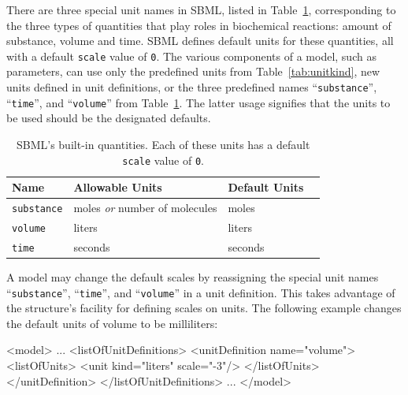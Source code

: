 \documentclass[10pt]{cekarticle}
\newenvironment{blockChanged}{\color{BrickRed}}{}
\begin{document}
\begin{blockChanged}
There are three special unit names in SBML, listed in
Table~\ref{tab:builtin}, corresponding to the three types of quantities
that play roles in biochemical reactions: amount of substance, volume and
time.  SBML defines default units for these quantities, all with a default
\texttt{scale} value of \texttt{0}.  The various components of a model,
such as parameters, can use only the predefined units from
Table~\ref{tab:unitkind}, new units defined in unit definitions, or the
three predefined names ``\texttt{substance}'', ``\texttt{time}'', and
``\texttt{volume}'' from Table~\ref{tab:builtin}.  The latter usage
signifies that the units to be used should be the designated defaults.  
\end{blockChanged}

\begin{table}[tb]
  \vspace*{-4pt}
  \centering
  \small
  \setlength{\tabcolsep}{4.5pt}
  \begin{blockChanged}
  \begin{tabular}{lllc}
    \toprule
    \textbf{Name} & \textbf{Allowable Units} & \textbf{Default Units}\\
    \midrule
    \texttt{substance} & moles \emph{or} number of molecules     & moles \\
    \texttt{volume}                & liters           & liters \\
    \texttt{time}                  & seconds          & seconds \\
    \bottomrule
  \end{tabular}
  \end{blockChanged}
  \caption{SBML's built-in quantities.  Each of these units has a default
  \texttt{scale} value of \texttt{0}.}
  \label{tab:builtin}
\end{table}

\begin{blockChanged}
A model may change the default scales by reassigning the special unit names
``\texttt{substance}'', ``\texttt{time}'', and ``\texttt{volume}'' in a
unit definition.  This takes advantage of the 
structure's facility for defining scales on units.  The following example
changes the default units of volume to be milliliters:
\end{blockChanged}

\begin{example}
<model>
    ...
    <listOfUnitDefinitions>
        <unitDefinition name="volume">
            <listOfUnits>
                <unit kind="liters" scale="-3"/>
            </listOfUnits>                
        </unitDefinition>
    </listOfUnitDefinitions>
    ...
</model>
\end{example}
\end{document}
